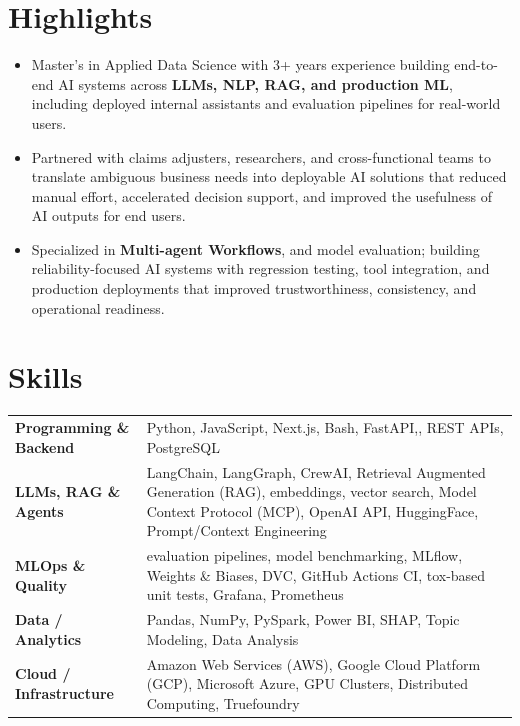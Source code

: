 \documentclass[11pt,a4paper,sans]{moderncv}
\begin{document}
\section{Highlights}
\setlength{\itemsep}{0pt}
\setlength{\parskip}{0pt}
\begin{itemize}[leftmargin=0.6cm, label={\textbullet}]
    \item Master’s in Applied Data Science with 3+ years experience building end-to-end AI systems across \textbf{LLMs, NLP, RAG, and production ML}, including deployed internal assistants and evaluation pipelines for real-world users.
    \vspace{-4pt}
    \item Partnered with claims adjusters, researchers, and cross-functional teams to translate ambiguous business needs into deployable AI solutions that reduced manual effort, accelerated decision support, and improved the usefulness of AI outputs for end users.
    \vspace{-4pt}
    \item Specialized in \textbf{Multi-agent Workflows}, and model evaluation; building reliability-focused AI systems with regression testing, tool integration, and production deployments that improved trustworthiness, consistency, and operational readiness.
    \vspace{-4pt}
\end{itemize}
\vspace{-16pt}

\section{Skills}
\vspace{-4pt}
\begin{tabularx}{\textwidth}{>{\raggedright\arraybackslash\bfseries}p{6cm}@{\hspace{0cm}}X}
Programming \& Backend & Python, JavaScript, Next.js, Bash, FastAPI,, REST APIs, PostgreSQL\\[4pt]
LLMs, RAG \& Agents & LangChain, LangGraph, CrewAI, Retrieval Augmented Generation (RAG), embeddings, vector search, Model Context Protocol (MCP), OpenAI API, HuggingFace, Prompt/Context Engineering\\[4pt]
MLOps \& Quality & evaluation pipelines, model benchmarking, MLflow, Weights \& Biases, DVC, GitHub Actions CI, tox-based unit tests, Grafana, Prometheus\\[4pt]
Data / Analytics & Pandas, NumPy, PySpark, Power BI, SHAP, Topic Modeling, Data Analysis\\[4pt]
Cloud / Infrastructure & Amazon Web Services (AWS), Google Cloud Platform (GCP), Microsoft Azure, GPU Clusters, Distributed Computing, Truefoundry\\[4pt]
\end{tabularx}
\vspace{-20pt}
\end{document}
